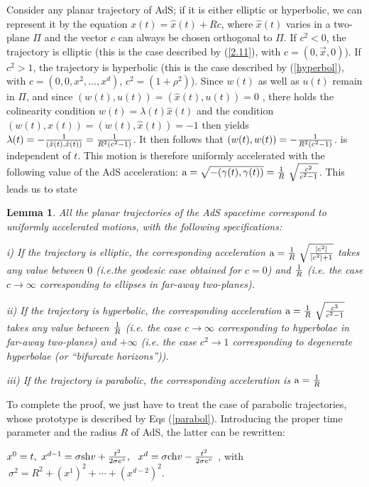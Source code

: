 \documentclass[a4paper,a4paper]{article}
\newtheorem{lemma}{Lemma}[section]
\begin{document}
Consider any planar trajectory of AdS; if it is either elliptic
or hyperbolic, we can represent it by the equation
$x(t) = \hat x(t) + R c$, where $\hat x(t)$ varies in a two-plane $\Pi$
and the vector $c$ can always be chosen orthogonal to $\Pi$.
If $c^2 <0$, the trajectory is
elliptic (this is the case described by (\ref{2.11}), with
$c= (0,\vec x,0)$).  If $c^2 >1$, the trajectory is hyperbolic
(this is the case described by (\ref{hyperbol}), with
$c=   (0,0,x^2,\ldots, x^d)$, $c^2= (1+\rho^2)$).
Since $w(t)$ as well as $u(t)$ remain in $\Pi$, and since
$(w(t),u(t))= (\hat x(t),u(t)) =0$ , there holds the colinearity
condition $w(t)= \lambda (t) \hat x(t)$ and the condition
$(w(t),x(t))= (w(t),\hat x(t)) =-1$ then yields
$\lambda (t) = -{1\over (\hat x(t),\hat x(t))} = {1\over R^2(c^2-1)}$.
It then follows that
$(w(t),w(t))=
- {1\over R^2(c^2-1)}$.
is independent of $t$. This motion is therefore uniformly
accelerated with the following value of the AdS acceleration:
$ {\rm a}= {\sqrt {-(\gamma(t),\gamma(t))}} =
{1\over R}\  \sqrt {c^2\over c^2 -1}$.
This leads us to state

\begin{lemma}
All the planar trajectories of the AdS spacetime correspond to
uniformly accelerated motions, with the following specifications:

i) If the trajectory is elliptic, the corresponding acceleration
${\rm a} =
{1\over R}\  \sqrt {|c^2|\over |c^2| +1}$
takes any value between $0$
(i.e.the geodesic case obtained for $c=0$)
and $1\over R$ (i.e. the case
$c \to \infty$ corresponding to
ellipses in far-away two-planes).

ii) If the trajectory is hyperbolic, the corresponding acceleration
${\rm a} =
{1\over R}\  \sqrt {c^2\over c^2 -1}$
takes any value between
$1\over R$ (i.e. the case
$c \to \infty$ corresponding to
hyperbolae in far-away two-planes)
and $+\infty$
(i.e. the case $c^2 \to 1$ corresponding to
degenerate hyperbolae (or ``bifurcate horizons'')).

iii) If the trajectory is parabolic, the corresponding acceleration is
${\rm a} = {1\over R}$
\label{accel}
\end{lemma}

To complete the proof,
we just have to treat the case of parabolic trajectories,
whose prototype is described by Eqs (\ref{parabol}).
Introducing the proper time parameter and the radius
$R$ of AdS, the latter can be rewritten:

$x^0 =t,\
x^{d-1} = \sigma {\rm sh} v + {t^2\over 2\sigma e^v },\ \
x^d = \sigma {\rm ch} v - {t^2\over 2\sigma e^v }\ $,
with $\ \sigma^2 = R^2 + (x^1)^2 + \cdots + (x^{d-2})^2$.
\end{document}
